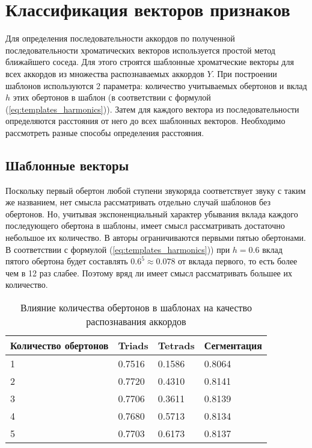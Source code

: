 \section{Классификация векторов признаков} \label{sect3_class}

Для определения последовательности аккордов по полученной последовательности
хроматических векторов используется простой метод ближайшего соседа. Для этого
строятся шаблонные хроматческие векторы для всех аккордов из множества
распознаваемых аккордов $Y$. При построении шаблонов используются 2 параметра:
количество учитываемых обертонов и вклад $h$ этих обертонов в шаблон (в
соответствии с формулой (\ref{eq:templates_harmonics})). Затем для каждого
вектора из последовательности определяются расстояния от него до всех шаблонных
векторов. Необходимо рассмотреть разные способы определения расстояния.

\subsection{Шаблонные векторы} \label{ssect3_templates}

Поскольку первый обертон любой ступени звукоряда соответствует звуку с таким же
названием, нет смысла рассматривать отдельно случай шаблонов без обертонов. Но,
учитывая экспоненциальный характер убывания вклада каждого последующего обертона
в шаблоны, имеет смысл рассматривать достаточно небольшое их количество. В
\cite{Oudre2009} авторы ограничиваются первыми пятью обертонами. В соответствии
с формулой (\ref{eq:templates_harmonics})) при $h=0.6$ вклад пятого обертона
будет составлять $0.6^5 \approx 0.078$ от вклада первого, то есть более чем в 12
раз слабее. Поэтому вряд ли имеет смысл рассматривать большее их количество.

\begin{table} [htbp]
  \centering
  \parbox{15cm}{\caption{Влияние количества обертонов в шаблонах на качество
  распознавания аккордов} \label{Tover}}
  \begin{tabular}{|l|l|l|l|}
  \hline
  Количество обертонов & Triads & Tetrads & Сегментация \\
  \hline
  1 & 0.7516 & 0.1586 & 0.8064 \\
  2 & 0.7720 & 0.4310 & 0.8141 \\
  3 & 0.7706 & 0.3611 & 0.8139 \\
  4 & 0.7680 & 0.5713 & 0.8134 \\
  5 & 0.7703 & 0.6173 & 0.8137 \\
  \hline
  \end{tabular}
\end{table}

